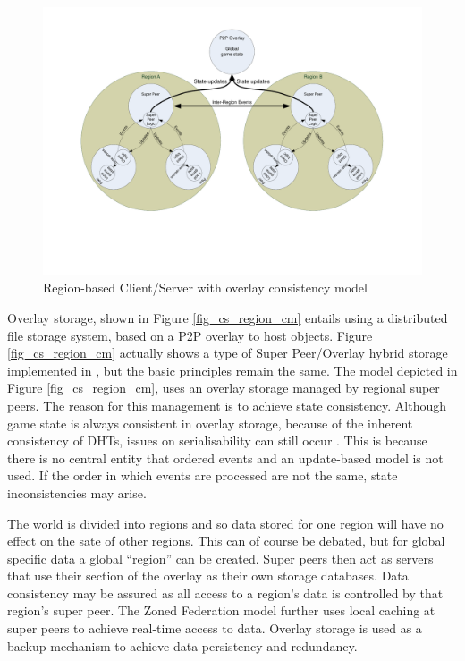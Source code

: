 \documentclass[journal,oneside,a4paper,onecolumn]{IEEEtran}
\begin{document}
\begin{figure}[htbp]
 \centering
 \includegraphics[clip=true, viewport=2cm 5cm 27cm 19.5cm, width=\columnwidth]{region_based_CS_CM_P2PO}
 \caption{Region-based Client/Server with overlay consistency model}
 \label{fig_cs_region_o_cm}
\end{figure}
%
Overlay storage, shown in Figure \ref{fig_cs_region_cm} entails using a distributed file storage system, based on a P2P overlay to host objects. Figure \ref{fig_cs_region_cm} actually shows a type of Super Peer/Overlay hybrid storage implemented in \cite{zoned_federation}, but the basic principles remain the same. The model depicted in Figure \ref{fig_cs_region_cm}, uses an overlay storage managed by regional super peers. The reason for this management is to achieve state consistency. Although game state is always consistent in overlay storage, because of the inherent consistency of DHTs, issues on serialisability can still occur \cite{zoned_federation}. This is because there is no central entity that ordered events and an update-based model is not used. If the order in which events are processed are not the same, state inconsistencies may arise.

The world is divided into regions and so data stored for one region will have no effect on the sate of other regions. This can of course be debated, but for global specific data a global ``region'' can be created. Super peers then act as servers that use their section of the overlay as their own storage databases. Data consistency may be assured as all access to a region's data is controlled by that region's super peer. The Zoned Federation model further uses local caching at super peers to achieve real-time access to data. Overlay storage is used as a backup mechanism to achieve data persistency and redundancy.
\end{document}
